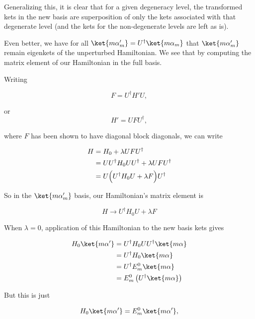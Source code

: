 Generalizing this, it is clear that for a given degeneracy level, the transformed kets in the new basis are superposition of only the kets associated with that degenerate level (and the kets for the non-degenerate levels are left as is).

Even better, we have for all $\ket{m \alpha_m'} = U^\dagger \ket{m \alpha_m}$ that $\ket{m \alpha_m'}$ remain eigenkets of the unperturbed Hamiltonian.  We see that by computing the matrix element of our Hamiltonian in the full basis.

Writing

\begin{equation}\label{eqn:pertubationDegeneracy:410}
F = U^\dagger H' U,
\end{equation}

or
\begin{equation}\label{eqn:pertubationDegeneracy:430}
H' = U F U^\dagger,
\end{equation}

where $F$ has been shown to have diagonal block diagonals, we can write

\begin{align*}\label{eqn:pertubationDegeneracy:450}
H 
&= H_0 + \lambda U F U^\dagger \\
&= U U^\dagger H_0 U U^\dagger + \lambda U F U^\dagger \\
&= U \Bigl( U^\dagger H_0 U + \lambda F \Bigr) U^\dagger 
\end{align*}

So in the $\ket{m \alpha_m'}$ basis, our Hamiltonian's matrix element is

\begin{equation}\label{eqn:pertubationDegeneracy:470}
H \rightarrow U^\dagger H_0 U + \lambda F 
\end{equation}

When $\lambda = 0$, application of this Hamiltonian to the new basis kets gives

\begin{align*}
H_0 
\ket{m \alpha'} 
&=
U^\dagger H_0 U 
U^\dagger
\ket{m \alpha}  \\
&=
U^\dagger H_0
\ket{m \alpha}  \\
&=
U^\dagger E_m^0
\ket{m \alpha}  \\
&=
E_m^0
\left(
U^\dagger 
\ket{m \alpha}\right)  \\
\end{align*}

But this is just

\begin{equation}\label{eqn:pertubationDegeneracy:490}
H_0 \ket{m \alpha'} = E_m^0 \ket{m \alpha'},
\end{equation}

